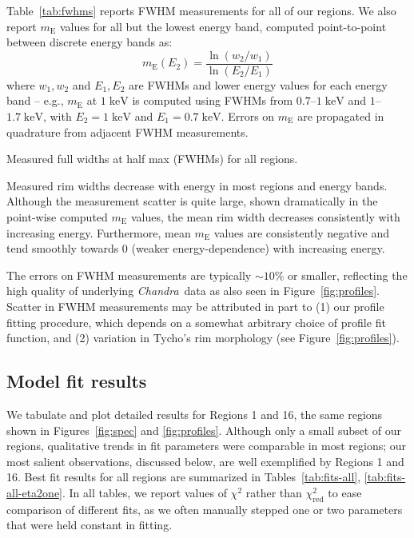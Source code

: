 \documentclass[iop, apj, numberedappendix]{emulateapj}
\newcommand*{\mt}{\mathrm}
\newcommand*{\unit}[1]{\;\mt{#1}}  %
\newcommand*{\abt}{\mathord{\sim}} %
\newcommand*{\Chandra}{\textit{Chandra}\ }
\newcommand*{\mE}{m_\mt{E}}
\begin{document}
Table~\ref{tab:fwhms} reports FWHM measurements for all of our regions.
We also report $\mE$ values for all but the lowest energy band, computed
point-to-point between discrete energy bands as:
\begin{equation}
    \mE(E_2) = \frac{\ln(w_2/w_1)}{\ln(E_2/E_1)}
\end{equation}
where $w_1, w_2$ and $E_1, E_2$ are FWHMs and lower energy values for each
energy band -- e.g., $\mE$ at $1 \unit{keV}$ is computed using FWHMs from
$0.7$--$1 \unit{keV}$ and $1$--$1.7 \unit{keV}$, with $E_2 = 1 \unit{keV}$ and
$E_1 = 0.7 \unit{keV}$.  Errors on $\mE$ are propagated in quadrature from
adjacent FWHM measurements.

\begin{table*}
    \iftoggle{manuscript}{
        \tiny
    }{
        \scriptsize
    }
    \centering
    \caption{Measured full widths at half max (FWHMs) for all regions.
             \label{tab:fwhms}}
    
\end{table*}

Measured rim widths decrease with energy in most regions and energy bands.
Although the measurement scatter is quite large, shown dramatically in the
point-wise computed $\mE$ values, the mean rim width decreases consistently
with increasing energy.  Furthermore, mean $\mE$ values are consistently
negative and tend smoothly towards $0$ (weaker energy-dependence) with
increasing energy.

The errors on FWHM measurements are typically $\abt 10\%$ or smaller,
reflecting the high quality of underlying \Chandra data as also seen in
Figure~\ref{fig:profiles}.  Scatter in FWHM measurements may be attributed in
part to (1) our profile fitting procedure, which depends on a somewhat
arbitrary choice of profile fit function, and (2) variation in Tycho's rim
morphology (see Figure~\ref{fig:profiles}).

\subsection{Model fit results}
\label{sec:fit-results}

We tabulate and plot detailed results for Regions 1 and 16, the same regions
shown in Figures~\ref{fig:spec} and \ref{fig:profiles}.  Although only a small
subset of our regions, qualitative trends in fit parameters were comparable in
most regions; our most salient observations, discussed below, are well
exemplified by Regions 1 and 16.  Best fit results for all regions are
summarized in Tables~\ref{tab:fits-all}, \ref{tab:fits-all-eta2one}.  In all
tables, we report values of $\chi^2$ rather than $\chi^2_\mt{red}$ to ease
comparison of different fits, as we often manually stepped one or two
parameters that were held constant in fitting.
\end{document}
